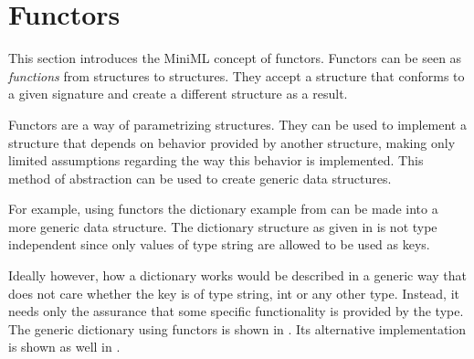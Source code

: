 \documentclass[10pt,a4paper,master=cws, masteroption=ai,english,inputenc=utf8]{kulemt}
\begin{document}
\section{Functors\label{sec:Functors}}
This section introduces the MiniML concept of functors. Functors can be seen as \emph{functions} from structures to structures.
They accept a structure that conforms to a given signature and create a different structure as a result.

Functors are a way of parametrizing structures.
They can be used to implement a structure that depends on behavior provided by another structure, making only limited assumptions regarding the way this behavior is implemented.
This method of abstraction can be used to create generic data structures.

For example, using functors the dictionary example from  can be made into a more generic data structure. 
The dictionary structure as given in  is not type independent since only values of type string are allowed to be used as keys.

Ideally however, how a dictionary works would be described in a generic way that does not care whether the key is of type string, int or any other type.
Instead, it needs only the assurance that some specific functionality is provided by the type.
The generic dictionary using functors is shown in . 
Its alternative implementation is shown as well in .
\end{document}
